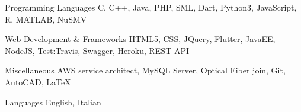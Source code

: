 

\begin{cvskills}

  \cvskill
    {Programming Languages} %
    {C, C++, Java, PHP, SML, Dart, Python3, JavaScript, R, MATLAB, NuSMV} %

  \cvskill
    {Web Development \& Frameworks} %
    {HTML5, CSS, JQuery, Flutter, JavaEE, NodeJS, Test:Travis, Swagger, Heroku, REST API} %

  \cvskill
    {Miscellaneous} %
    {AWS service architect, MySQL Server, Optical Fiber join, Git, AutoCAD, LaTeX} %

  \cvskill
    {Languages} %
    {English, Italian} %

\end{cvskills}
